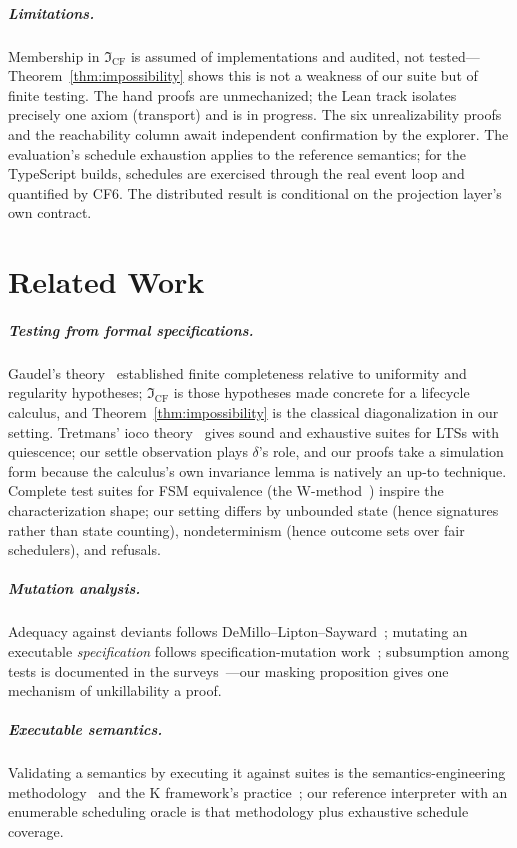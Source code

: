 \documentclass[sigplan,screen,review,nonacm]{acmart}
\newcommand{\CF}{\ensuremath{\mathfrak I_{\mathrm{CF}}}}
\begin{document}
\subparagraph{Limitations.} Membership in \CF{} is assumed of implementations
and audited, not tested---Theorem~\ref{thm:impossibility} shows this is not a
weakness of our suite but of finite testing. The hand proofs are unmechanized;
the Lean track isolates precisely one axiom (transport) and is in progress.
The six unrealizability proofs and the reachability column await independent
confirmation by the explorer. The evaluation's schedule exhaustion applies to
the reference semantics; for the TypeScript builds, schedules are exercised
through the real event loop and quantified by CF6. The distributed result is
conditional on the projection layer's own contract.

\section{Related Work}\label{sec:related}

\subparagraph{Testing from formal specifications.} Gaudel's
theory~\cite{gaudel95} established finite completeness relative to uniformity
and regularity hypotheses; \CF{} is those hypotheses made concrete for a
lifecycle calculus, and Theorem~\ref{thm:impossibility} is the classical
diagonalization in our setting. Tretmans' \textsf{ioco}
theory~\cite{tretmans96, tretmans08} gives sound and exhaustive suites for
LTSs with quiescence; our settle observation plays $\delta$'s role, and our
proofs take a simulation form because the calculus's own invariance lemma is
natively an up-to technique. Complete test suites for FSM equivalence (the
W-method~\cite{chow78}) inspire the characterization shape; our setting
differs by unbounded state (hence signatures rather than state counting),
nondeterminism (hence outcome sets over fair schedulers), and refusals.

\subparagraph{Mutation analysis.} Adequacy against deviants follows
DeMillo--Lipton--Sayward~\cite{demillo78}; mutating an executable
\emph{specification} follows specification-mutation work~\cite{black00};
subsumption among tests is documented in the surveys~\cite{jia11,
papadakis17}---our masking proposition gives one mechanism of unkillability a
proof.

\subparagraph{Executable semantics.} Validating a semantics by executing it
against suites is the semantics-engineering methodology~\cite{felleisen09}
and the K framework's practice~\cite{rosu10}; our reference interpreter with
an enumerable scheduling oracle is that methodology plus exhaustive schedule
coverage.
\end{document}
